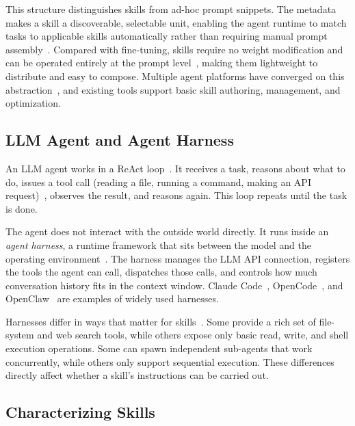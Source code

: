 This structure distinguishes skills from ad-hoc prompt snippets.
The metadata makes a skill a discoverable, selectable unit, enabling the
agent runtime to match tasks to applicable skills automatically rather than
requiring manual prompt assembly~\cite{claude-code-skills}.
Compared with fine-tuning, skills require no weight modification
and can be operated entirely at the prompt level~\cite{ouyang2022training, liu2021pretrain}, making them lightweight to
distribute and easy to compose.
Multiple agent platforms have converged on this
abstraction~\cite{claude-code-skills, cursor-skills, openai-codex-cli, agentskills-spec, antigravity-skills, coze-skills}, and existing
tools support basic skill authoring, management, and optimization.

\subsection{LLM Agent and Agent Harness}
\label{sec:back:harness}

An LLM agent works in a ReAct loop~\cite{yao2023react}. It receives a task, reasons
about what to do, issues a tool call (reading a file, running
a command, making an API request)~\cite{schick2023toolformer, openai2023functioncalling}, observes the result, and
reasons again. This loop repeats until the task is done.

The agent does not interact with the outside world directly.
It runs inside an \emph{agent harness}, a runtime framework
that sits between the model and the operating environment~\cite{wu2023autogen, langgraph}.
The harness manages the LLM API connection, registers the
tools the agent can call, dispatches those calls, and controls
how much conversation history fits in the context window.
Claude Code~\cite{claudecode}, OpenCode~\cite{opencode}, and OpenClaw~\cite{openclaw} are examples of widely used
harnesses.

Harnesses differ in ways that matter for skills~\cite{google-a2a}.
Some provide a rich set of file-system and web search tools,
while others expose only basic read, write, and shell execution operations.
Some can spawn independent sub-agents that work concurrently,
while others only support sequential execution.
These differences directly affect whether a skill's instructions can be carried out.

\subsection{Characterizing Skills}
\label{sec:insight:analysis}

